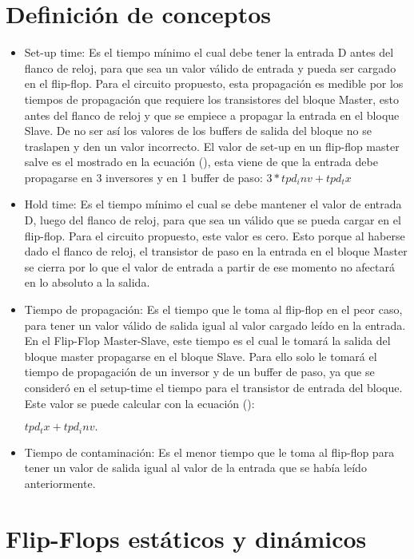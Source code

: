 \documentclass[12pt,a4paper]{article} %
\begin{document}
\section{Definición de conceptos}

\begin{itemize}
\item Set-up time: Es el tiempo mínimo el cual debe tener la entrada D antes del flanco de reloj, para que sea un valor válido de entrada y pueda ser cargado en el flip-flop. 
Para el circuito propuesto, esta propagación es medible por los tiempos de propagación que requiere los transistores del bloque Master, esto antes del flanco de reloj y que se empiece a propagar la entrada en el bloque Slave. De no ser así los valores de los buffers de salida del bloque no se traslapen y den un valor incorrecto. 
El valor de set-up en un flip-flop master salve es el mostrado en la ecuación (), esta viene de que la entrada debe propagarse en 3 inversores y en 1 buffer de paso:
 $3 *tpd_inv + tpd_tx$

\item Hold time: Es el tiempo mínimo el cual se debe mantener el valor de entrada D, luego del flanco de reloj, para que sea un válido que se pueda cargar en el flip-flop.
Para el circuito propuesto, este valor es cero. Esto porque al haberse dado el flanco de reloj, el transistor de paso en la entrada en el bloque Master se cierra por lo que el valor de entrada a partir de ese momento no afectará en lo absoluto a la salida. 

\item Tiempo de propagación: Es el tiempo que le toma al flip-flop en el peor caso, para tener un valor válido de salida igual al valor cargado leído en la entrada.
En el Flip-Flop Master-Slave, este tiempo es el cual le tomará la salida del bloque master propagarse en el bloque Slave. Para ello solo le tomará el tiempo de propagación de un inversor y de un buffer de paso, ya que se consideró en el setup-time el tiempo para el transistor de entrada del bloque.
Este valor se puede calcular con la ecuación (): 

$tpd_tx + tpd_inv.$

\item Tiempo de contaminación: Es el menor tiempo que le toma al flip-flop para tener un valor de salida igual al valor de la entrada que se había leído anteriormente.

\end{itemize}

\section{Flip-Flops estáticos y dinámicos}
\end{document}
